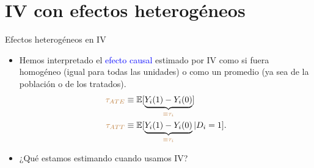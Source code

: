 \documentclass[10pt, xcolor=dvipsnames]{beamer}
\begin{document}
\section{IV con efectos heterogéneos}

\begin{frame}{Efectos heterogéneos en IV}
\begin{itemize}
	\item Hemos interpretado el \textcolor{blue}{efecto causal} estimado por IV como si fuera homogéneo (igual para todas las unidades) o como un promedio (ya sea de la población o de los tratados).
		\begin{align*}
			\begin{split}
				\textcolor{brown}{\tau_{ATE}} &\equiv \operatorname{\mathbb{E}}[\underbrace{Y_i(1) - Y_i(0)}_{\textcolor{brown}{\equiv \tau_i}}] \\
				\textcolor{brown}{\tau_{ATT}} &\equiv \operatorname{\mathbb{E}}[\underbrace{Y_i(1) - Y_i(0)}_{\textcolor{brown}{\equiv \tau_i}}|D_i=1].
			\end{split}
		\end{align*}
	\item ¿Qué estamos estimando cuando usamos IV?
\end{itemize}
\end{frame}
\end{document}
